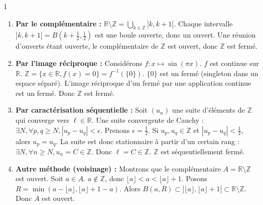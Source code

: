 \begin{correction}{1}
\begin{enumerate}
    \item \textbf{Par le complémentaire :}
$\mathbb{R} \setminus \mathbb{Z} = \bigcup_{k \in \mathbb{Z}} ]k, k+1[$.
Chaque intervalle $]k, k+1[ = B(k+\frac{1}{2}, \frac{1}{2})$ est une boule ouverte, donc un ouvert.
Une réunion d'ouverts étant ouverte, le complémentaire de $\mathbb{Z}$ est ouvert, donc $\mathbb{Z}$ est fermé.
    \item \textbf{Par l'image réciproque :}
Considérons $f : x \mapsto \sin(\pi x)$.
$f$ est continue sur $\mathbb{R}$.
$\mathbb{Z} = \{ x \in \mathbb{R}, f(x)=0 \} = f^{-1}(\{0\})$.
$\{0\}$ est un fermé (singleton dans un espace séparé). L'image réciproque d'un fermé par une application continue est un fermé. Donc $\mathbb{Z}$ est fermé.
    \item \textbf{Par caractérisation séquentielle :}
Soit $(u_{n})$ une suite d'éléments de $\mathbb{Z}$ qui converge vers $\ell \in \mathbb{R}$.
Une suite convergente de Cauchy : $\exists N, \forall p,q \ge N, |u_{p} - u_{q}| < \epsilon$.
Prenons $\epsilon = \frac{1}{2}$.
Si $u_{p}, u_{q} \in \mathbb{Z}$ et $|u_{p} - u_{q}| < \frac{1}{2}$, alors $u_{p} = u_{q}$.
La suite est donc stationnaire à partir d'un certain rang : $\exists N, \forall n \ge N, u_{n} = C \in \mathbb{Z}$.
Donc $\ell = C \in \mathbb{Z}$. $\mathbb{Z}$ est séquentiellement fermé.
    \item \textbf{Autre méthode (voisinage) :}
Montrons que le complémentaire $A = \mathbb{R} \setminus \mathbb{Z}$ est ouvert.
Soit $a \in A$. $a \notin \mathbb{Z}$, donc $\lfloor a \rfloor < a < \lfloor a \rfloor + 1$.
Posons $R = \min(a - \lfloor a \rfloor, \lfloor a \rfloor + 1 - a)$.
Alors $B(a, R) \subset ]\lfloor a \rfloor, \lfloor a \rfloor + 1[ \subset \mathbb{R} \setminus \mathbb{Z}$.
Donc $A$ est ouvert.
\end{enumerate}
\end{correction}

